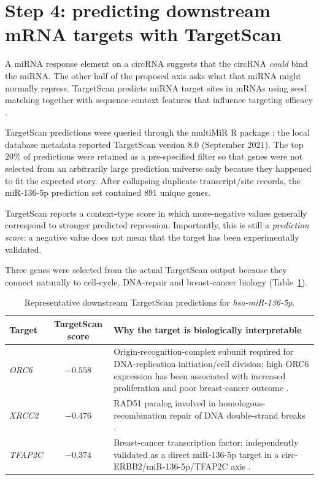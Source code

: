 \documentclass[11pt]{article}
\newcommand{\mir}[1]{\textit{#1}}
\newcommand{\gene}[1]{\textit{#1}}
\begin{document}
\section{Step 4: predicting downstream mRNA targets with TargetScan}

A miRNA response element on a circRNA suggests that the circRNA \emph{could} bind the miRNA. The other half of the proposed axis asks what that miRNA might normally repress. TargetScan predicts miRNA target sites in mRNAs using seed matching together with sequence-context features that influence targeting efficacy \cite{Agarwal2015TargetScan}.

TargetScan predictions were queried through the multiMiR R package \cite{Ru2014multiMiR}; the local database metadata reported TargetScan version 8.0 (September 2021). The top 20\% of predictions were retained as a pre-specified filter so that genes were not selected from an arbitrarily large prediction universe only because they happened to fit the expected story. After collapsing duplicate transcript/site records, the miR-136-5p prediction set contained 891 unique genes.

TargetScan reports a context-type score in which more-negative values generally correspond to stronger predicted repression. Importantly, this is still a \emph{prediction score}: a negative value does not mean that the target has been experimentally validated.

Three genes were selected from the actual TargetScan output because they connect naturally to cell-cycle, DNA-repair and breast-cancer biology (Table~\ref{tab:targets}).

\begin{table}[ht]
\centering
\caption{Representative downstream TargetScan predictions for \mir{hsa-miR-136-5p}.}
\label{tab:targets}
\begin{tabularx}{\linewidth}{@{}l c X@{}}
\toprule
\textbf{Target} & \textbf{TargetScan score} & \textbf{Why the target is biologically interpretable} \\
\midrule
\gene{ORC6} & $-0.558$ & Origin-recognition-complex subunit required for DNA-replication initiation/cell division; high ORC6 expression has been associated with increased proliferation and poor breast-cancer outcome \cite{Ibrahim2024ORC6}. \\
\gene{XRCC2} & $-0.476$ & RAD51 paralog involved in homologous-recombination repair of DNA double-strand breaks \cite{Andreassen2019XRCC2}. \\
\gene{TFAP2C} & $-0.374$ & Breast-cancer transcription factor; independently validated as a direct miR-136-5p target in a circ-ERBB2/miR-136-5p/TFAP2C axis \cite{Zhong2021circERBB2}. \\
\bottomrule
\end{tabularx}
\end{table}
\end{document}
